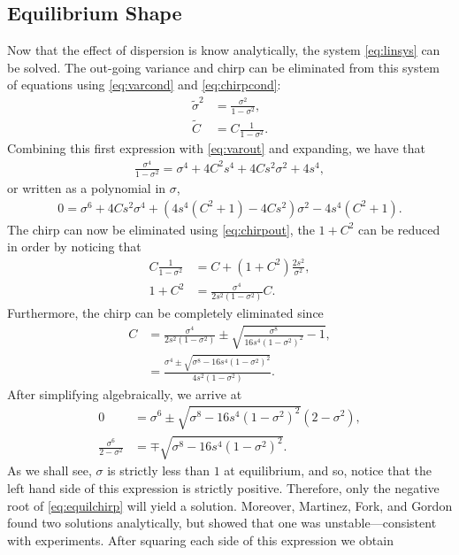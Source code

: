 \subsection{Equilibrium Shape}
Now that the effect of dispersion is know analytically, the system \eqref{eq:linsys} can be solved. The out-going variance and chirp can be eliminated from this system of equations using \eqref{eq:varcond} and \eqref{eq:chirpcond}:
\begin{align*}
\widetilde{\sigma}^2 &= \frac{\sigma^2}{1 - \sigma^2}, \\
\widetilde{C} &= C \frac{1}{1 - \sigma^2}.
\end{align*}
Combining this first expression with \eqref{eq:varout} and expanding, we have that
\begin{align*}
\frac{\sigma^4}{1 - \sigma^2} = \sigma^4 + 4 C^2 s^4 + 4 C s^2 \sigma^2 + 4s^4,
\end{align*}
or written as a polynomial in $\sigma$,
\begin{align*}
0 = \sigma^6 + 4 C s^2 \sigma^4 + \left( 4s^4 (C^2 + 1) - 4 C s^2 \right) \sigma^2 - 4s^4 (C^2 + 1).
\end{align*}
The chirp can now be eliminated using \eqref{eq:chirpout}, the $1+C^2$ can be reduced in order by noticing that
\begin{align*}
C \frac{1}{1 - \sigma^2} &= C + (1 + C^2) \frac{2s^2}{\sigma^2}, \\
1 + C^2 &= \frac{\sigma^4}{2s^2(1 - \sigma^2)} C.
\end{align*}
Furthermore, the chirp can be completely eliminated since
\begin{align}
\nonumber
C &= \frac{\sigma^4}{2s^2(1 - \sigma^2)} \pm \sqrt{\frac{\sigma^8}{16s^4(1 - \sigma^2)^2} - 1}, \\
\label{eq:equilchirp}
&= \frac{\sigma^4 \pm \sqrt{\sigma^8 - 16s^4(1 - \sigma^2)^2}}{4s^2(1 - \sigma^2)}.
\end{align}
After simplifying algebraically, we arrive at
\begin{align*}
0 &= \sigma^6 \pm \sqrt{\sigma^8 - 16s^4(1 - \sigma^2)^2}(2 - \sigma^2), \\
\frac{\sigma^6}{2 - \sigma^2} &= \mp \sqrt{\sigma^8 - 16s^4(1 - \sigma^2)^2}.
\end{align*}
As we shall see, $\sigma$ is strictly less than $1$ at equilibrium, and so, notice that the left hand side of this expression is strictly positive. Therefore, only the negative root of \eqref{eq:equilchirp} will yield a solution. Moreover, Martinez, Fork, and Gordon \cite{martinez1984} found two solutions analytically, but showed that one was unstable---consistent with experiments. After squaring each side of this expression we obtain
